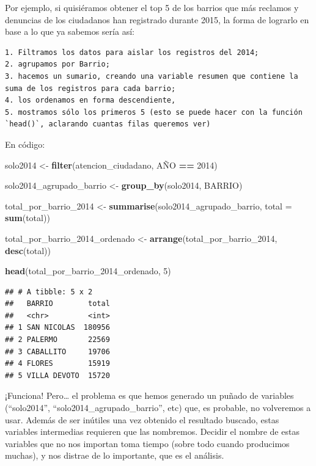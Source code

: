 \documentclass[spanish,]{book}
\newenvironment{Shaded}{\begin{snugshade}}{\end{snugshade}}
\newcommand{\DataTypeTok}[1]{\textcolor[rgb]{0.13,0.29,0.53}{#1}}
\newcommand{\DecValTok}[1]{\textcolor[rgb]{0.00,0.00,0.81}{#1}}
\newcommand{\KeywordTok}[1]{\textcolor[rgb]{0.13,0.29,0.53}{\textbf{#1}}}
\newcommand{\NormalTok}[1]{#1}
\newcommand{\OperatorTok}[1]{\textcolor[rgb]{0.81,0.36,0.00}{\textbf{#1}}}
\newcommand{\StringTok}[1]{\textcolor[rgb]{0.31,0.60,0.02}{#1}}
\begin{document}
Por ejemplo, si quisiéramos obtener el top 5 de los barrios que más reclamos y denuncias de los ciudadanos han registrado durante 2015, la forma de lograrlo en base a lo que ya sabemos sería así:

\begin{verbatim}
1. Filtramos los datos para aislar los registros del 2014;
2. agrupamos por Barrio;
3. hacemos un sumario, creando una variable resumen que contiene la suma de los registros para cada barrio;
4. los ordenamos en forma descendiente,
5. mostramos sólo los primeros 5 (esto se puede hacer con la función `head()`, aclarando cuantas filas queremos ver)
\end{verbatim}

En código:

\begin{Shaded}
\begin{Highlighting}[]
\NormalTok{solo2014 <-}\StringTok{ }\KeywordTok{filter}\NormalTok{(atencion_ciudadano, AÑO }\OperatorTok{==}\StringTok{ }\DecValTok{2014}\NormalTok{)}

\NormalTok{solo2014_agrupado_barrio <-}\StringTok{ }\KeywordTok{group_by}\NormalTok{(solo2014, BARRIO)}

\NormalTok{total_por_barrio_}\DecValTok{2014}\NormalTok{ <-}\StringTok{ }\KeywordTok{summarise}\NormalTok{(solo2014_agrupado_barrio, }\DataTypeTok{total =} \KeywordTok{sum}\NormalTok{(total))}

\NormalTok{total_por_barrio_}\DecValTok{2014}\NormalTok{_ordenado <-}\StringTok{ }\KeywordTok{arrange}\NormalTok{(total_por_barrio_}\DecValTok{2014}\NormalTok{, }\KeywordTok{desc}\NormalTok{(total))}

\KeywordTok{head}\NormalTok{(total_por_barrio_}\DecValTok{2014}\NormalTok{_ordenado, }\DecValTok{5}\NormalTok{)}
\end{Highlighting}
\end{Shaded}

\begin{verbatim}
## # A tibble: 5 x 2
##   BARRIO        total
##   <chr>         <int>
## 1 SAN NICOLAS  180956
## 2 PALERMO       22569
## 3 CABALLITO     19706
## 4 FLORES        15919
## 5 VILLA DEVOTO  15720
\end{verbatim}

¡Funciona! Pero\ldots{} el problema es que hemos generado un puñado de variables (``solo2014'', ``solo2014\_agrupado\_barrio'', etc) que, es probable, no volveremos a usar. Además de ser inútiles una vez obtenido el resultado buscado, estas variables intermedias requieren que las nombremos. Decidir el nombre de estas variables que no nos importan toma tiempo (sobre todo cuando producimos muchas), y nos distrae de lo importante, que es el análisis.
\end{document}
